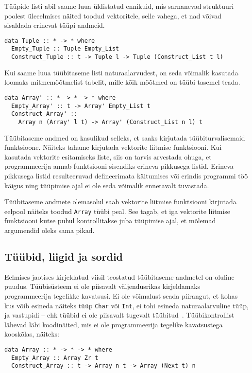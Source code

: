 \documentclass[12pt]{article}
\begin{document}
      Tüüpide listi abil saame luua üldistatud ennikuid, mis sarnanevad struktuuri poolest üleeelmises näited toodud vektoritele, selle vahega, et nad võivad sisaldada erinevat tüüpi andmeid.

      \begin{verbatim}data Tuple :: * -> * where
  Empty_Tuple :: Tuple Empty_List
  Construct_Tuple :: t -> Tuple l -> Tuple (Construct_List t l)\end{verbatim}

      Kui saame luua tüübitaseme listi naturaalarvudest, on seda võimalik kasutada loomaks mitmemõõtmelist tabelit, mille kõik mõõtmed on tüübi tasemel teada.

      \begin{verbatim}data Array' :: * -> * -> * where
  Empty_Array' :: t -> Array' Empty_List t
  Construct_Array' ::
    Array n (Array' l t) -> Array' (Construct_List n l) t\end{verbatim}

      Tüübitaseme andmed on kasulikud selleks, et saaks kirjutada tüübiturvalisemaid funktsioone. Näiteks tahame kirjutada vektorite liitmise funktsiooni. Kui kasutada vektorite esitamiseks liste, siis on tarvis arvestada ohuga, et programmeerija annab funktsiooni sisendiks erineva pikkusega listid. Erineva pikkusega listid resulteeruvad defineerimata käitumises või erindis programmi töö käigus ning tüüpimise ajal ei ole seda võimalik ennetavalt tuvastada.

      Tüübitaseme andmete olemasolul saab vektorite liitmise funktsiooni kirjutada eelpool näiteks toodud \verb!Array! tüübi peal. See tagab, et iga vektorite liitmise funktsiooni kutse puhul kontrollitakse juba tüüpimise ajal, et mõlemad argumendid oleks sama pikad.
    \subsection{Tüübid, liigid ja sordid}\label{liiksort}
      Eelmises jaotises kirjeldatud viisil teostatud tüübitaseme andmetel on oluline puudus. Tüübisüsteem ei ole piisavalt väljendusrikas kirjeldamaks programmeerija tegelikke kavatsusi. Ei ole võimalust seada piirangut, et kohas kus võib esineda näiteks tüüp \verb!Char! või \verb!Int!, ei tohi esineda naturaalarvuline tüüp, ja vastupidi -- ehk tüübid ei ole piisavalt tugevalt tüübitud~\cite{Giv}. Tüübikontrollist lähevad läbi koodinäited, mis ei ole programmeerija tegelike kavatsustega kooskõlas, näiteks:

      \begin{verbatim}data Array :: * -> * -> * where
  Empty_Array :: Array Zr t
  Construct_Array :: t -> Array n t -> Array (Next t) n\end{verbatim}
\end{document}
